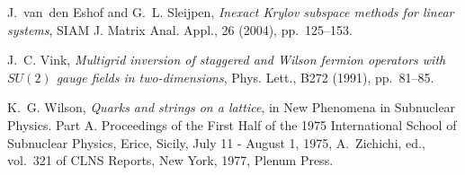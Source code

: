 \documentclass{siamltex}
\begin{document}
\begin{thebibliography}{10}
  {\sc J.~van~den Eshof and G.~L. Sleijpen}, {\em Inexact {K}rylov subspace
      methods for linear systems}, SIAM J. Matrix Anal. Appl., 26 (2004),
  pp.~125--153.

  {\sc J.~C. Vink}, {\em Multigrid inversion of staggered and {W}ilson fermion
      operators with {        $SU(2)$        } gauge fields in two-dimensions}, Phys. Lett., B272
  (1991), pp.~81--85.

  {\sc K.~G. Wilson}, {\em Quarks and strings on a lattice}, in New Phenomena in
  Subnuclear Physics. Part A. Proceedings of the First Half of the 1975
  International School of Subnuclear Physics, Erice, Sicily, July 11 - August
  1, 1975, A.~Zichichi, ed., vol.~321 of {CLNS} Reports, New York, 1977, Plenum
  Press.

\end{thebibliography}
\end{document}
